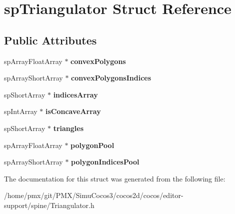 \hypertarget{structspTriangulator}{}\section{sp\+Triangulator Struct Reference}
\label{structspTriangulator}
\subsection*{Public Attributes}
\begin{DoxyCompactItemize}
\item 
\mbox{\label{structspTriangulator_aa0efee686b0b17d347ada1c171522754}} 
sp\+Array\+Float\+Array $\ast$ {\bfseries convex\+Polygons}
\item 
\mbox{\label{structspTriangulator_a54a0aa3dab1be555688201b0df128909}} 
sp\+Array\+Short\+Array $\ast$ {\bfseries convex\+Polygons\+Indices}
\item 
\mbox{\label{structspTriangulator_a8ec17fb92471b5c0ac2ebaf979cac0a6}} 
sp\+Short\+Array $\ast$ {\bfseries indices\+Array}
\item 
\mbox{\label{structspTriangulator_aa30ebbeb798ec4e22be528d13b98de61}} 
sp\+Int\+Array $\ast$ {\bfseries is\+Concave\+Array}
\item 
\mbox{\label{structspTriangulator_adad07ec742e3fd0f5c44bd49402c0674}} 
sp\+Short\+Array $\ast$ {\bfseries triangles}
\item 
\mbox{\label{structspTriangulator_ad98bd9db9609692b0dc1ab4c647ecd8c}} 
sp\+Array\+Float\+Array $\ast$ {\bfseries polygon\+Pool}
\item 
\mbox{\label{structspTriangulator_a55ebd19728d6d5ebf290a2f9e1c60f30}} 
sp\+Array\+Short\+Array $\ast$ {\bfseries polygon\+Indices\+Pool}
\end{DoxyCompactItemize}


The documentation for this struct was generated from the following file\+:\begin{DoxyCompactItemize}
\item 
/home/pmx/git/\+P\+M\+X/\+Simu\+Cocos3/cocos2d/cocos/editor-\/support/spine/Triangulator.\+h\end{DoxyCompactItemize}
